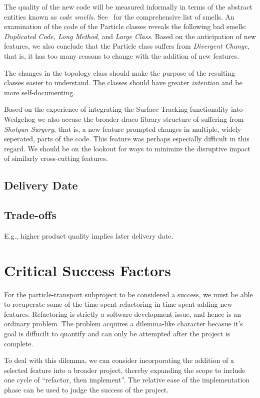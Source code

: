 \documentclass[11pt]{nmemo}
\begin{document}
The quality of the new code will be measured informally in terms of
the abstract entities known as {\em code smells}. See~\cite[Chapter
3]{fowler00} for the comprehensive list of smells. An examination of
the code of the Particle classes reveals the following bad smells:
{\em Duplicated Code, Long Method}, and {\em Large Class}.  Based on
the anticipation of new features, we also conclude that the Particle
class suffers from {\em Divergent Change}, that is, it has too many
reasons to change with the addition of new features. 

The changes in the topology class should make the purpose of the
resulting classes easier to understand. The classes should have
greater {\em intention} and be more self-documenting.

Based on the experience of integrating the Surface Tracking
functionality into Wedgehog we also accuse the broader draco library
structure of suffering from {\em Shotgun Surgery}, that is, a new
feature prompted changes in multiple, widely seperated, parts of the
code. This feature was perhaps especially difficult in this regard. We
should be on the lookout for ways to minimize the disruptive impact of
similarly cross-cutting features.

\subsection*{Delivery Date}

\subsection*{Trade-offs}
             E.g., higher product quality implies later delivery date.


\newpage
\section*{Critical Success Factors}

For the particle-transport subproject to be considered a success, we
must be able to recuperate some of the time spent refactoring in time
spent adding new features. Refactoring is strictly a software
development issue, and hence is an ordinary problem. The problem
acquires a dilemma-like character becasue it's goal is diffucilt to
quantify and can only be attempted after the project is complete.

To deal with this dilemma, we can consider incorporating the addition
of a selected feature into a broader project, thereby expanding the
scope to include one cycle of ``refactor, then implement''. The
relative ease of the implementation phase can be used to judge the
success of the project.
\end{document}
